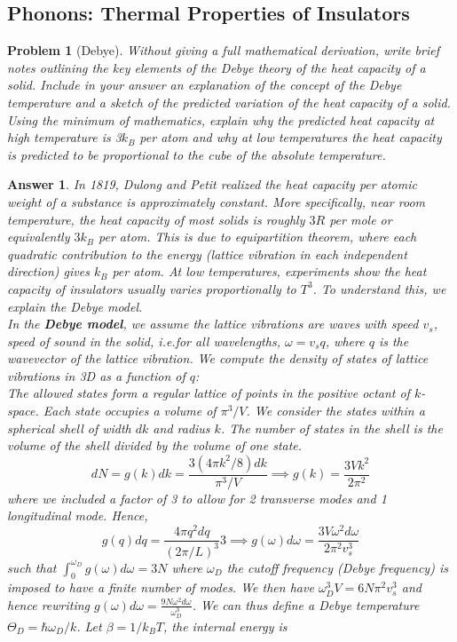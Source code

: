 \documentclass[a4paper]{article}
\newtheorem{ans}{Answer}[section]
\theoremstyle{new}
\newtheorem{qns}{Problem}[section]
\begin{document}
\subsection*{Phonons: Thermal Properties of Insulators}
\begin{qns}[Debye]
Without giving a full mathematical derivation, write brief notes outlining the key elements of the Debye theory of the heat capacity of a solid. Include in your answer an explanation of the concept of the Debye temperature and a sketch of the predicted variation of the heat capacity of a solid. Using the minimum of mathematics, explain why the predicted heat capacity at high temperature is 3$k_B$ per atom and why at low temperatures the heat capacity is predicted to be proportional to the cube of the absolute temperature.
\end{qns}
\begin{ans}
In 1819, Dulong and Petit realized the heat capacity per atomic weight of a substance is approximately constant. More specifically, near room temperature, the heat capacity of most solids is roughly $3R$ per mole or equivalently $3k_B$ per atom. This is due to equipartition theorem, where each quadratic contribution to the energy (lattice vibration in each independent direction) gives $k_B$ per atom. At low temperatures, experiments show the heat capacity of insulators usually varies proportionally to $T^3$. To understand this, we explain the Debye model.\\[5pt]
In the \textbf{Debye model}, we assume the lattice vibrations are waves with speed $v_s$, speed of sound in the solid, i.e.for all wavelengths, $\omega=v_sq$, where $q$ is the wavevector of the lattice vibration. We compute the density of states of lattice vibrations in 3D as a function of $q$:\\[5pt]
The allowed states form a regular lattice of points in the positive octant of $k$-space. Each state occupies a volume of $\pi^3/V$. We consider the states within a spherical shell of width $dk$ and radius $k$. The number of states in the shell is the volume of the shell divided by the volume of one state.
$$dN=g(k)dk=\frac{3(4\pi k^2/8)dk}{\pi^3/V}\implies g(k)=\frac{3Vk^2}{2\pi^2}$$
where we included a factor of 3 to allow for 2 transverse modes and 1 longitudinal mode. Hence,
$$g(q)dq=\frac{4\pi q^2dq}{(2\pi/L)^3}3\implies g(\omega)d\omega=\frac{3V\omega^2d\omega}{2\pi^2v_s^3}$$
such that $\int_0^{\omega_D}g(\omega)d\omega=3N$ where $\omega_D$ the cutoff frequency (Debye frequency) is imposed to have a finite number of modes. We then have $\omega_D^3V=6N\pi^2v_s^3$ and hence rewriting $g(\omega)d\omega=\frac{9N\omega^2d\omega}{\omega_D^3}$. We can thus define a Debye temperature $\Theta_D=\hbar\omega_D/k$. Let $\beta=1/k_BT$, the internal energy is 

\end{ans}
\end{document}
